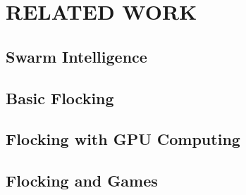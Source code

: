 \chapter{RELATED WORK}


\section{Swarm Intelligence}


\section{Basic Flocking}


\section{Flocking with GPU Computing}


\section{Flocking and Games}


